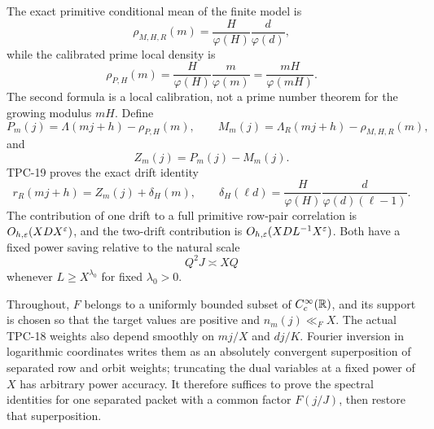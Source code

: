The exact primitive conditional mean of the finite model is
\begin{equation}
 \rho_{M,H,R}(m)
 =\frac{H}{\varphi(H)}\frac d{\varphi(d)},
 \label{eq:tpc20-model-density}
\end{equation}
while the calibrated prime local density is
\begin{equation}
 \rho_{P,H}(m)
 =\frac{H}{\varphi(H)}\frac m{\varphi(m)}
 =\frac{mH}{\varphi(mH)}.
 \label{eq:tpc20-prime-density}
\end{equation}
The second formula is a local calibration, not a prime number theorem
for the growing modulus \(mH\).  Define
\begin{equation}
 P_m(j)=\Lambda(mj+h)-\rho_{P,H}(m),
 \qquad
 M_m(j)=\Lambda_R(mj+h)-\rho_{M,H,R}(m),
 \label{eq:tpc20-PM-signals}
\end{equation}
and
\begin{equation}
 Z_m(j)=P_m(j)-M_m(j).
 \label{eq:tpc20-Z-signal}
\end{equation}
TPC-19 proves the exact drift identity
\begin{equation}
 r_R(mj+h)=Z_m(j)+\delta_H(m),
 \qquad
 \delta_H(\ell d)
 =\frac{H}{\varphi(H)}
   \frac{d}{\varphi(d)(\ell-1)}.
 \label{eq:tpc20-row-drift}
\end{equation}
The contribution of one drift to a full primitive row-pair correlation
is \(O_{h,\varepsilon}(XDX^\varepsilon)\), and the two-drift contribution is
\(O_{h,\varepsilon}(XD L^{-1}X^\varepsilon)\).  Both have a fixed power saving relative
to the natural scale
\begin{equation}
 Q^2J\asymp XQ
 \label{eq:tpc20-natural-scale}
\end{equation}
whenever \(L\ge X^{\lambda_0}\) for fixed \(\lambda_0>0\).

Throughout, \(F\) belongs to a uniformly bounded subset of
\(C_c^\infty(\mathbb R)\), and its support is chosen so that the target values
are positive and \(n_m(j)\ll_F X\).  The actual TPC-18 weights also
depend smoothly on \(mj/X\) and \(dj/K\).  Fourier inversion in
logarithmic coordinates writes them as an absolutely convergent
superposition of separated row and orbit weights; truncating the dual
variables at a fixed power of \(X\) has arbitrary power accuracy.  It
therefore suffices to prove the spectral identities for one separated
packet with a common factor \(F(j/J)\), then restore that superposition.
